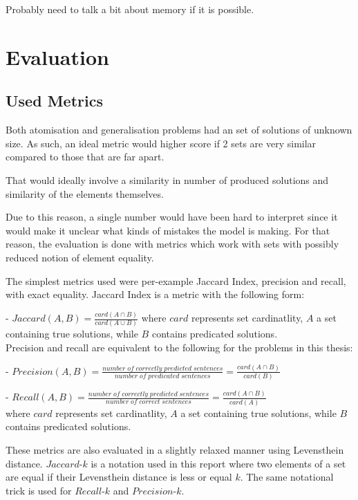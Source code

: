 Probably need to talk a bit about memory if it is possible.


\section{Evaluation}

\subsection{Used Metrics}

Both atomisation and generalisation problems had an set of solutions of unknown size.
As such, an ideal metric would higher score if 2 sets are very similar compared to those that are far apart.

That would ideally involve a similarity in number of produced solutions and similarity of the elements themselves.

Due to this reason, a single number would have been hard to interpret since it would make it unclear what kinds of mistakes the model is making. 
For that reason, the evaluation is done with metrics which work with sets with possibly reduced notion of element equality.

The simplest metrics used were per-example Jaccard Index, precision and recall, with exact equality.
Jaccard Index is a metric with the following form:

 - $Jaccard(A, B) = \frac{card(A \cap B)}{card(A \cup B)}$ where $card$ represents set cardinatlity, $A$ a set containing true solutions, while $B$ contains predicated solutions.\\
 
Precision and recall are equivalent to the following for the problems in this thesis:
 
  - $Precision(A, B) = \frac{number \; of \; correctly \; predicted \; sentences}{number \; of \; predicated \; sentences} = \frac{card(A \cap B)}{card(B)}$
  
  - $Recall(A, B) = \frac{number \; of \; correctly \; predicted \; sentences}{number \; of \; correct \; sentences} = \frac{card(A \cap B)}{card(A)}$ \\
where  $card$ represents set cardinatlity, $A$ a set containing true solutions, while $B$ contains predicated solutions.

These metrics are also evaluated in a slightly relaxed manner using Levensthein distance.
$Jaccard\text{-}k$ is a notation used in this report where two elements of a set are equal if their Levensthein distance is less or equal $k$.
The same notational trick is used for $Recall\text{-}k$ and $Precision\text{-}k$.






